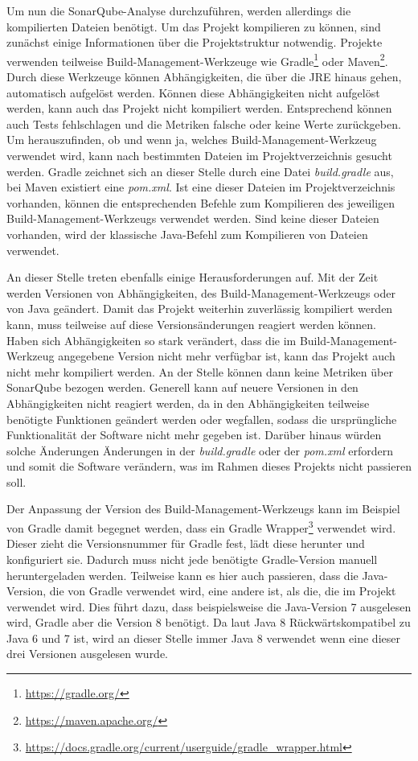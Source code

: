 \documentclass[
	oneside,  %
	ngerman, 
	final, 
	11pt, 
	a4paper, 
	1.1headlines, 
	headinclude=false, 
	footinclude=false, 
	mpinclude=false, 
	pagesize, 
	onecolumn, 
	titlepage, 
	parskip=half, 
	headsepline, 
	chapterprefix=false, 
	version=first, 
	listof=totoc, 
	bibliography=totoc, 
	toc=graduated, 
	fleqn
]{scrbook}
\begin{document}
Um nun die SonarQube-Analyse durchzuführen, werden allerdings die kompilierten Dateien benötigt.
Um das Projekt kompilieren zu können, sind zunächst einige Informationen über die Projektstruktur notwendig.
Projekte verwenden teilweise Build-Management-Werkzeuge wie Gradle\footnote{\url{https://gradle.org/}} oder Maven\footnote{\url{https://maven.apache.org/}}.
Durch diese Werkzeuge können Abhängigkeiten, die über die \acf{JRE} hinaus gehen, automatisch aufgelöst werden.
Können diese Abhängigkeiten nicht aufgelöst werden, kann auch das Projekt nicht kompiliert werden.
Entsprechend können auch Tests fehlschlagen und die Metriken falsche oder keine Werte zurückgeben.
Um herauszufinden, ob und wenn ja, welches Build-Management-Werkzeug verwendet wird, kann nach bestimmten Dateien im Projektverzeichnis gesucht werden.
Gradle zeichnet sich an dieser Stelle durch eine Datei \textit{build.gradle} aus, bei Maven existiert eine \textit{pom.xml}.
Ist eine dieser Dateien im Projektverzeichnis vorhanden, können die entsprechenden Befehle zum Kompilieren des jeweiligen Build-Management-Werkzeugs verwendet werden.
Sind keine dieser Dateien vorhanden, wird der klassische Java-Befehl zum Kompilieren von Dateien verwendet.

An dieser Stelle treten ebenfalls einige Herausforderungen auf.
Mit der Zeit werden Versionen von Abhängigkeiten, des Build-Management-Werkzeugs oder von Java geändert.
Damit das Projekt weiterhin zuverlässig kompiliert werden kann, muss teilweise auf diese Versionsänderungen reagiert werden können.
Haben sich Abhängigkeiten so stark verändert, dass die im Build-Management-Werkzeug angegebene Version nicht mehr verfügbar ist, kann das Projekt auch nicht mehr kompiliert werden.
An der Stelle können dann keine Metriken über SonarQube bezogen werden.
Generell kann auf neuere Versionen in den Abhängigkeiten nicht reagiert werden, da in den Abhängigkeiten teilweise benötigte Funktionen geändert werden oder wegfallen, sodass die ursprüngliche Funktionalität der Software nicht mehr gegeben ist.
Darüber hinaus würden solche Änderungen Änderungen in der \textit{build.gradle} oder der \textit{pom.xml} erfordern und somit die Software verändern, was im Rahmen dieses Projekts nicht passieren soll.

Der Anpassung der Version des Build-Management-Werkzeugs kann im Beispiel von Gradle damit begegnet werden, dass ein Gradle Wrapper\footnote{\url{https://docs.gradle.org/current/userguide/gradle_wrapper.html}} verwendet wird.
Dieser zieht die Versionsnummer für Gradle fest, lädt diese herunter und konfiguriert sie.
Dadurch muss nicht jede benötigte Gradle-Version manuell heruntergeladen werden.
Teilweise kann es hier auch passieren, dass die Java-Version, die von Gradle verwendet wird, eine andere ist, als die, die im Projekt verwendet wird.
Dies führt dazu, dass beispielsweise die Java-Version 7 ausgelesen wird, Gradle aber die Version 8 benötigt.
Da laut \cite{OB2021} Java 8 Rückwärtskompatibel zu Java 6 und 7 ist, wird an dieser Stelle immer Java 8 verwendet wenn eine dieser drei Versionen ausgelesen wurde.
\end{document}
